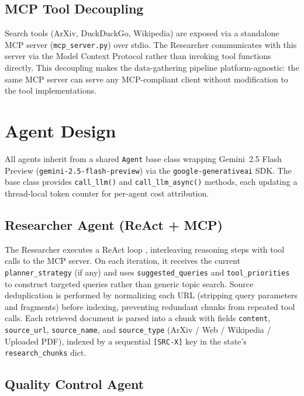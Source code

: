 \documentclass[11pt]{article}
\begin{document}
\subsection{MCP Tool Decoupling}

Search tools (ArXiv, DuckDuckGo, Wikipedia) are exposed via a standalone MCP
server (\texttt{mcp\_server.py}) over stdio. The Researcher communicates with
this server via the Model Context Protocol \citep{mcp2024} rather than invoking
tool functions directly. This decoupling makes the data-gathering pipeline
platform-agnostic: the same MCP server can serve any MCP-compliant client
without modification to the tool implementations.

\section{Agent Design}

All agents inherit from a shared \texttt{Agent} base class wrapping Gemini~2.5
Flash Preview (\texttt{gemini-2.5-flash-preview}) via the
\texttt{google-generativeai} SDK. The base class provides \texttt{call\_llm()}
and \texttt{call\_llm\_async()} methods, each updating a thread-local token
counter for per-agent cost attribution.

\subsection{Researcher Agent (ReAct + MCP)}

The Researcher executes a ReAct loop \citep{yao2022react}, interleaving reasoning
steps with tool calls to the MCP server. On each iteration, it receives the
current \texttt{planner\_strategy} (if any) and uses \texttt{suggested\_queries}
and \texttt{tool\_priorities} to construct targeted queries rather than generic
topic search. Source deduplication is performed by normalizing each URL
(stripping query parameters and fragments) before indexing, preventing redundant
chunks from repeated tool calls. Each retrieved document is parsed into a chunk
with fields \texttt{content}, \texttt{source\_url}, \texttt{source\_name}, and
\texttt{source\_type} (ArXiv / Web / Wikipedia / Uploaded PDF), indexed by a
sequential \texttt{[SRC-X]} key in the state's \texttt{research\_chunks} dict.

\subsection{Quality Control Agent}
\end{document}
